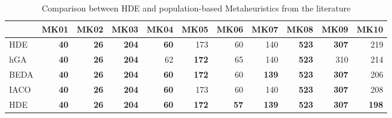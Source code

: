 \begin{table}[!tb]
\scriptsize
  \centering
  \caption{Comparison between HDE and population-based Metaheuristics from the literature}
    \begin{tabular}{l|rrrrrrrrrr|}
    \hline
    \multicolumn{1}{r}{} & \multicolumn{1}{l}{MK01} & \multicolumn{1}{l}{MK02} & \multicolumn{1}{l}{MK03} & \multicolumn{1}{l}{MK04} & \multicolumn{1}{l}{MK05} & \multicolumn{1}{l}{MK06} & \multicolumn{1}{l}{MK07} & \multicolumn{1}{l}{MK08} & \multicolumn{1}{l}{MK09} & \multicolumn{1}{l}{MK10} \\
    \hline
    HDE   & \textbf{40} & \textbf{26} & \textbf{204} & \textbf{60} & 173   & 60    & 140   & \textbf{523} & \textbf{307} & 219 \\
    hGA   & \textbf{40} & \textbf{26} & \textbf{204} & 62    & \textbf{172} & 65    & 140   & \textbf{523} & 310   & 214 \\
    BEDA  & \textbf{40} & \textbf{26} & \textbf{204} & \textbf{60} & \textbf{172} & 60    & \textbf{139} & \textbf{523} & \textbf{307} & 206 \\
    IACO  & \textbf{40} & \textbf{26} & \textbf{204} & \textbf{60} & 173   & 60    & 140   & \textbf{523} & \textbf{307} & 208 \\
    HDE   & \textbf{40} & \textbf{26} & \textbf{204} & \textbf{60} & \textbf{172} & \textbf{57} & \textbf{139} & \textbf{523} & \textbf{307} & \textbf{198} \\
\hline
    \end{tabular}%
  \label{tab:addlabel}%
\end{table}%

